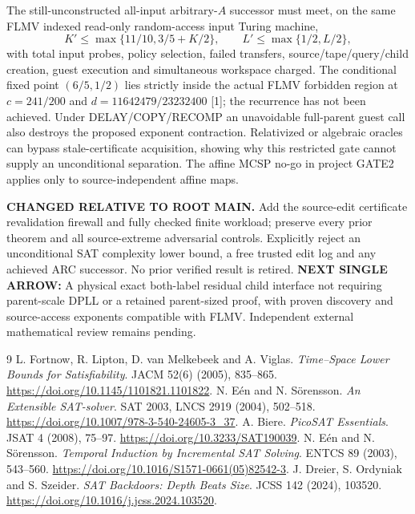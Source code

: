 \documentclass[11pt]{article}
\begin{document}
The still-unconstructed all-input arbitrary-$A$ successor must meet, on the same FLMV indexed read-only random-access input Turing machine,
\[
K'\le\max\{11/10,3/5+K/2\},\qquad
L'\le\max\{1/2,L/2\},
\]
with total input probes, policy selection, failed transfers, source/tape/query/child creation, guest execution and simultaneous workspace charged. The conditional fixed point $(6/5,1/2)$ lies strictly inside the actual FLMV forbidden region at $c=241/200$ and $d=11642479/23232400$ [1]; the recurrence has not been achieved. Under DELAY/COPY/RECOMP an unavoidable full-parent guest call also destroys the proposed exponent contraction. Relativized or algebraic oracles can bypass stale-certificate acquisition, showing why this restricted gate cannot supply an unconditional separation. The affine MCSP no-go in project GATE2 applies only to source-independent affine maps.

\noindent\textbf{CHANGED RELATIVE TO ROOT MAIN.} Add the source-edit certificate revalidation firewall and fully checked finite workload; preserve every prior theorem and all source-extreme adversarial controls. Explicitly reject an unconditional SAT complexity lower bound, a free trusted edit log and any achieved ARC successor. No prior verified result is retired. \textbf{NEXT SINGLE ARROW:} A physical exact both-label residual child interface not requiring parent-scale DPLL or a retained parent-sized proof, with proven discovery and source-access exponents compatible with FLMV. Independent external mathematical review remains pending.

\begin{thebibliography}{9}
 L. Fortnow, R. Lipton, D. van Melkebeek and A. Viglas. \emph{Time--Space Lower Bounds for Satisfiability}. JACM 52(6) (2005), 835--865. \url{https://doi.org/10.1145/1101821.1101822}.
 N. E\'en and N. S\"orensson. \emph{An Extensible SAT-solver}. SAT 2003, LNCS 2919 (2004), 502--518. \url{https://doi.org/10.1007/978-3-540-24605-3_37}.
 A. Biere. \emph{PicoSAT Essentials}. JSAT 4 (2008), 75--97. \url{https://doi.org/10.3233/SAT190039}.
 N. E\'en and N. S\"orensson. \emph{Temporal Induction by Incremental SAT Solving}. ENTCS 89 (2003), 543--560. \url{https://doi.org/10.1016/S1571-0661(05)82542-3}.
 J. Dreier, S. Ordyniak and S. Szeider. \emph{SAT Backdoors: Depth Beats Size}. JCSS 142 (2024), 103520. \url{https://doi.org/10.1016/j.jcss.2024.103520}.
\end{thebibliography}
\end{document}
